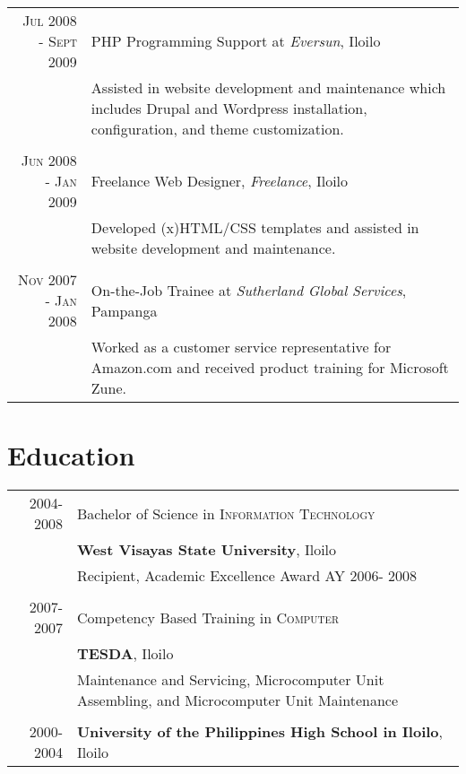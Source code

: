 \documentclass[a4paper,10pt]{article}
\begin{document}
\begin{tabular}{r|p{11cm}}
  \textsc{Jul 2008 - Sept 2009} & PHP Programming Support at \emph{Eversun}, Iloilo\\
                              &\footnotesize{Assisted in website development and maintenance which includes Drupal and Wordpress installation, configuration, and theme customization.}\\
  \multicolumn{2}{c}{}\\

  \textsc{Jun 2008 - Jan 2009} & Freelance Web Designer, \emph{Freelance}, Iloilo\\
                             &\footnotesize{Developed (x)HTML/CSS templates and assisted in website development and maintenance.}\\
  \multicolumn{2}{c}{}\\

  \textsc{Nov 2007 - Jan 2008} & On-the-Job Trainee at \emph{Sutherland Global Services}, Pampanga\\
                             &\footnotesize{Worked as a customer service representative for Amazon.com and received product training for Microsoft Zune.}\\
\end{tabular}

\section{Education}

\begin{tabular}{rp{12cm}}
  \textsc{2004-2008} & Bachelor of Science in \textsc{Information Technology}\\&\textbf{West Visayas State University}, Iloilo\\&\small{Recipient, Academic Excellence Award AY 2006- 2008}\\&\\
  \textsc{2007-2007} & Competency Based Training in \textsc{Computer}\\&\textbf{TESDA}, Iloilo\\&\small{Maintenance and Servicing, Microcomputer Unit  Assembling, and Microcomputer Unit Maintenance}\\&\\
  \textsc{2000-2004} & \textbf{University of the Philippines High School in Iloilo}, Iloilo\\
\end{tabular}

\clearpage

\end{document}
